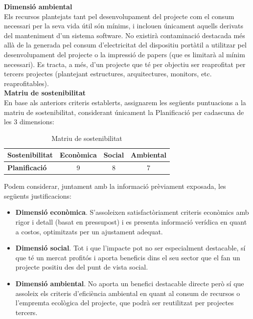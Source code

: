 \noindent \textbf{\large Dimensió ambiental}\\

\noindent Els recursos plantejats tant pel desenvolupament del projecte com el consum necessari per la seva vida útil són mínims, i inclouen únicament aquells derivats del manteniment d’un sistema software. No existirà contaminació destacada més allà de la generada pel consum d’electricitat del dispositiu portàtil a utilitzar pel desenvolupament del projecte o la impressió de papers (que es limitarà al mínim necessari). Es tracta, a més, d’un projecte que té per objectiu ser reaprofitat per tercers projectes (plantejant estructures, arquitectures, monitors, etc. reaprofitables).\\

\noindent \textbf{\large Matriu de sostenibilitat}\\

\noindent En base als anteriors criteris establerts, assignarem les següents puntuacions a la matriu de sostenibilitat, considerant únicament la Planificació per cadascuna de les 3 dimensions:

\begin{table}[htb]
\centering
\label{MatriuSostenibilitat}
\begin{tabular}{lccc}
\hline \textbf{Sostenibilitat}                           &  \textbf{Econòmica} & \textbf{Social}                           &  \textbf{Ambiental} \\
\hline
\textbf{Planificació} & 9 & 8 & 7 \\
\hline            
\end{tabular}%
\caption{Matriu de sostenibilitat}
\end{table}

Podem considerar, juntament amb la informació prèviament exposada, les següents justificacions:

\begin{itemize}
\item \textbf{Dimensió econòmica}. S’assoleixen satisfactòriament criteris econòmics amb rigor i detall (basat en pressupost) i es presenta informació verídica en quant a costos, optimitzats per un ajustament adequat.
\item \textbf{Dimensió social}. Tot i que l’impacte pot no ser especialment destacable, sí que té un mercat profitós i aporta beneficis dins el seu sector que el fan un projecte positiu des del punt de vista social.
\item \textbf{Dimensió ambiental}. No aporta un benefici destacable directe però sí que assoleix els criteris d’eficiència ambiental en quant al consum de recursos o l’empremta ecològica del projecte, que podrà ser reutilitzat per projectes tercers.
\end{itemize}